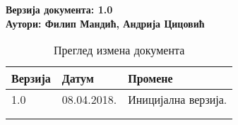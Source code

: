\noindent
\textbf{Верзија документа: 1.0} \\
\textbf{Аутори: Филип Мандић, Андрија Цицовић}

\begin{table}[h!]
\centering
\small

    \begin{tabular}{ || m{} | m{} | m{} || }
    \hline
    \textbf{Верзија} & \textbf{Датум} & \textbf{Промене} \\
    \hline
    \hline
    1.0 & 08.04.2018. &
    Иницијална верзија. \\
    \hline
    & & \\
    \hline
    & & \\
    \hline
    \end{tabular}
    \caption{Преглед измена документа}
    \label{table:1}

\end{table}
\newpage
